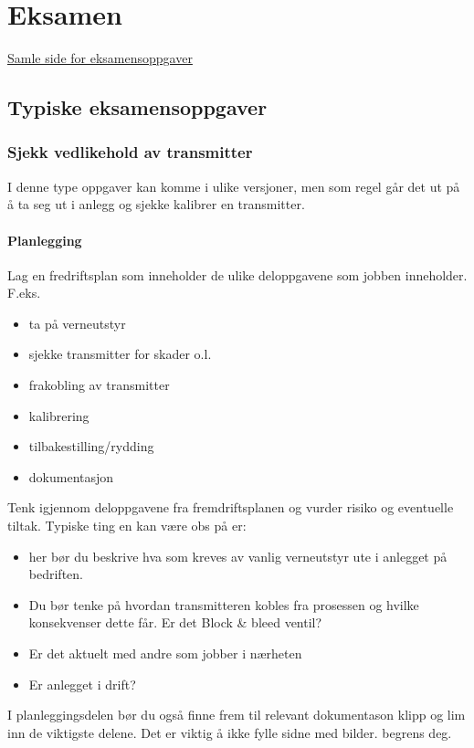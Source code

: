 
\chapter{Eksamen}
\href{https://sokeresultat.udir.no/eksamensoppgaver.html?query=AUT4002}{Samle side for eksamensoppgaver}


\section{Typiske eksamensoppgaver}

\subsection{Sjekk vedlikehold av transmitter}

I denne type oppgaver kan komme i ulike versjoner, men som regel går det ut på å ta seg ut i anlegg og sjekke kalibrer en transmitter. 
\subsubsection*{Planlegging}
Lag en fredriftsplan som inneholder de ulike deloppgavene  som jobben inneholder. 
F.eks. 
\begin{itemize}
	\item ta på verneutstyr
	\item sjekke transmitter for skader o.l. 
	\item frakobling av transmitter
	\item kalibrering
	\item tilbakestilling/rydding
	\item dokumentasjon
\end{itemize}


Tenk igjennom deloppgavene fra fremdriftsplanen og vurder risiko og eventuelle tiltak. Typiske ting en kan være obs på er:
\begin{itemize}
	\item her bør du beskrive hva som kreves av vanlig verneutstyr ute i anlegget på bedriften.
	\item Du bør tenke på hvordan transmitteren kobles fra prosessen og hvilke konsekvenser dette får. Er det Block \& bleed ventil? 
	\item Er det aktuelt med andre som jobber i nærheten
	\item Er anlegget i drift?
\end{itemize}

\vskip 5pt 
I planleggingsdelen bør du  også finne frem til relevant dokumentason klipp og lim inn de viktigste delene. Det er viktig å ikke fylle sidne med bilder. begrens deg.  

